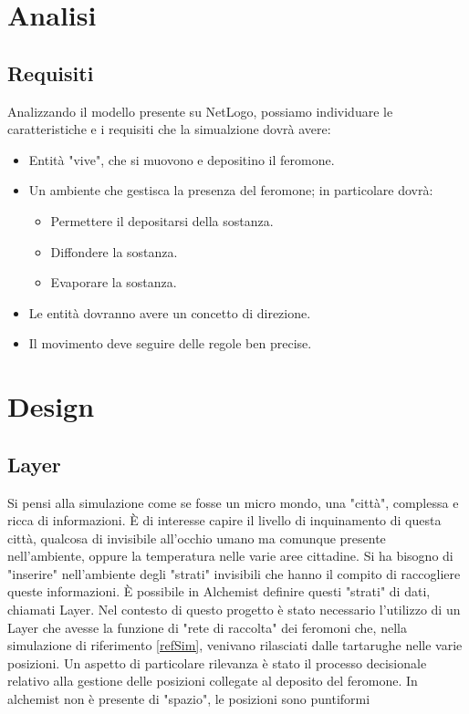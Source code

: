 \documentclass[12pt,a4paper,openright,twoside]{book}
\begin{document}
\chapter{Analisi}
\section{Requisiti}
Analizzando il modello presente su NetLogo\cite{wilensky1997netlogo}, possiamo individuare 
le caratteristiche e i requisiti che la simualzione dovrà avere:
\begin{itemize}
    \item Entità "vive", che si muovono e depositino il feromone.
    \item Un ambiente che gestisca la presenza del feromone; in particolare dovrà:
    \begin{itemize}
        \item Permettere il depositarsi della sostanza.
        \item Diffondere la sostanza.
        \item Evaporare la sostanza.
    \end{itemize}
    \item Le entità dovranno avere un concetto di direzione.
    \item Il movimento deve seguire delle regole ben precise.
\end{itemize}
\chapter{Design}

\section{Layer}
Si pensi alla simulazione come se fosse un micro mondo, una "città", complessa
e ricca di informazioni. È di interesse capire il livello di inquinamento di questa città, qualcosa di invisibile
all'occhio umano ma comunque presente nell'ambiente, oppure la temperatura nelle varie aree cittadine. Si ha bisogno
di "inserire" nell'ambiente degli "strati" invisibili che hanno il compito di raccogliere queste informazioni.
È possibile in Alchemist definire questi "strati" di dati, chiamati Layer.
\newline
Nel contesto di questo progetto è stato necessario l'utilizzo di un Layer che avesse la funzione di "rete di raccolta" 
dei feromoni che, nella simulazione di riferimento \ref{refSim}, venivano rilasciati dalle tartarughe nelle varie posizioni.
Un aspetto di particolare rilevanza è stato il processo decisionale relativo alla gestione delle posizioni collegate 
al deposito del feromone. In alchemist non è presente di "spazio", le posizioni sono puntiformi
\end{document}

